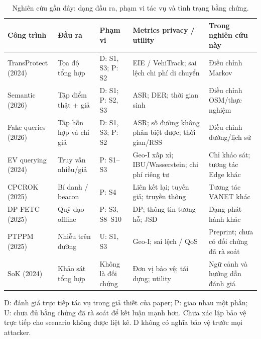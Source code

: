 \begin{table}[t]\centering\footnotesize
\caption{Nghiên cứu gần đây: dạng đầu ra, phạm vi tác vụ và tình trạng bằng chứng.}\label{tab:related}
\begin{tabularx}{\linewidth}{@{}P{2.5cm}P{2.05cm}P{2.15cm}YP{2.35cm}@{}}\toprule
\textbf{Công trình} & \textbf{Đầu ra} & \textbf{Phạm vi} & \textbf{Metrics privacy / utility} & \textbf{Trong nghiên cứu này} \\
\midrule
TransProtect (2024)\cite{transprotect} & Tọa độ tổng hợp & D: S1, S3; P: S2 & EIE / VehiTrack; sai lệch chi phí di chuyển & Điều chỉnh Markov \\
Semantic (2026)\cite{semantic} & Tập điểm thật + giả & D: S1; P: S2, S3 & ASR; DER; thời gian sinh & Điều chỉnh OSM/thực nghiệm \\
Fake queries (2026)\cite{fake} & Tập hỗn hợp và chỉ giả & D: S1, S3; P: S2 & ASR; số đường không phân biệt được; thời gian/RSS & Điều chỉnh đường/lịch sử \\
EV querying (2024)\cite{ev} & Truy vấn nhiễu/giả & P: S1--S3 & Geo-I xấp xỉ; IBU/Wasserstein; chi phí riêng tư & Chỉ khảo sát; tương tác Edge khác \\
CPCROK (2025)\cite{cpcrok} & Bí danh / beacon & P: S4 & Liên kết lại; tuyến giả; truyền thông & Tương tác VANET khác \\
DP-FETC (2025)\cite{dpfetc} & Quỹ đạo offline & P: S3, S8--S10 & DP; thông tin tương hỗ; JSD & Dạng phát hành khác \\
PTPPM (2025)\cite{ptppm} & Nhiễu trên đường & U: S1, S3 & Geo-I; sai lệch / QoS & Preprint; chưa có đối chứng đã rà soát \\
SoK (2024)\cite{sok} & Khảo sát tổng hợp & Không là đối chứng & Đơn vị bảo vệ; tái dựng; utility & Ngữ cảnh và hướng dẫn đánh giá \\
\bottomrule\end{tabularx}
\par\smallskip\raggedright D: đánh giá trực tiếp tác vụ trong giả thiết của paper; P: giao nhau một phần; U: chưa đủ bằng chứng đã rà soát để kết luận mạnh hơn. Chưa xác lập bảo vệ trực tiếp cho scenario không được liệt kê. D không có nghĩa bảo vệ trước mọi attacker.
\end{table}

